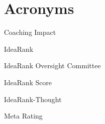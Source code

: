 \section*{Acronyms}

\begin{description}[style=nextline,leftmargin=0pt]

\item[CI] Coaching Impact

\item[IR] IdeaRank

\item[IROC] IdeaRank Oversight Committee

\item[IRS] IdeaRank Score

\item[IR-T] IdeaRank-Thought

\item[MR] Meta Rating

\end{description}


